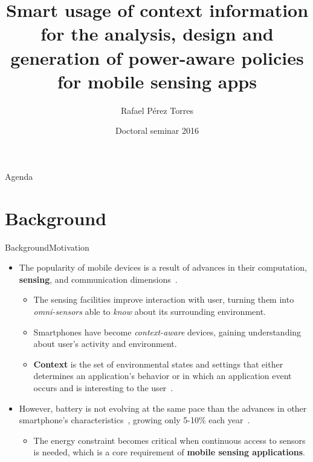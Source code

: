 \documentclass[10pt,xcolor={dvipsnames}]{beamer}
\title[Smart usage of context information for the analysis, design and generation of power-aware policies for MSA's]{Smart usage of context information for the analysis, design and generation of power-aware policies for mobile sensing apps}
\date{Doctoral seminar 2016}
\author{
  Rafael Pérez Torres
}
\institute[
  ITL Information Technology Laboratory\\
  Cinvestav\\
  Tamaulipas
] %
{%
  Dr. César Torres Huitzil\\
  Dr. Hiram Galeana Zapién\\

  LTI Cinvestav
  
}
\begin{document}
{\aauwavesbg%
\begin{frame} %
  \titlepage
\end{frame}}

\begin{frame}{Agenda}{}
\tableofcontents
\end{frame}

\section{Background}
\begin{frame}{Background}{Motivation}
\begin{itemize}
  \item<1-> The popularity of mobile devices is a result of advances in their computation, \textbf{sensing}, and communication dimensions~\cite{Islam2014}.
  \begin{itemize}
    \item<1-> The sensing facilities improve interaction with user, turning them into \emph{omni-sensors} able to \emph{know} about its surrounding environment.
    \item<2-> Smartphones have become \emph{context-aware} devices, gaining understanding about user's activity and environment.
    \item<3-> \textbf{Context} is the set of environmental states and settings that either determines an application's behavior or in which an application event occurs and is interesting to the user~\cite{Chen2000}.
  \end{itemize}
  \item<4-> However, battery is not evolving at the same pace than the advances in other smartphone's characteristics~\cite{Kjaergaard2012}, growing only 5-10\% each year~\cite{Ma2012,Evarts2015}.
  \begin{itemize}
    \item The energy constraint becomes critical when continuous access to sensors is needed, which is a core requirement of \textbf{mobile sensing applications}. 
  \end{itemize}
\end{itemize}
\end{frame}
\end{document}

